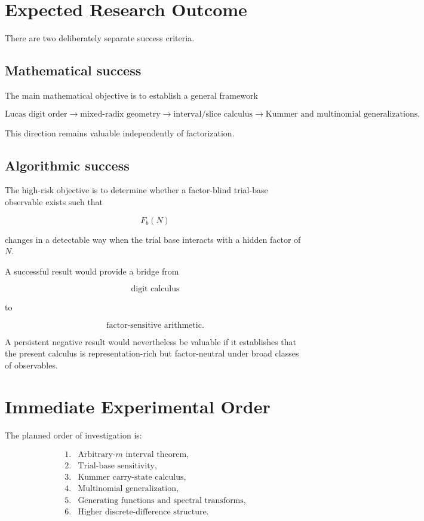 \documentclass[11pt]{article}
\begin{document}
\section{Expected Research Outcome}

There are two deliberately separate success criteria.

\subsection*{Mathematical success}

The main mathematical objective is to establish a general framework

$$
\boxed{
\text{Lucas digit order}
\longrightarrow
\text{mixed-radix geometry}
\longrightarrow
\text{interval/slice calculus}
\longrightarrow
\text{Kummer and multinomial generalizations}.
}
$$

This direction remains valuable independently of factorization.

\subsection*{Algorithmic success}

The high-risk objective is to determine whether a factor-blind trial-base observable exists such that

$$
F_b(N)
$$

changes in a detectable way when the trial base interacts with a hidden factor of $N$.

A successful result would provide a bridge from

$$
\text{digit calculus}
$$

to

$$
\text{factor-sensitive arithmetic}.
$$

A persistent negative result would nevertheless be valuable if it establishes that the present calculus is representation-rich but factor-neutral under broad classes of observables.

\section{Immediate Experimental Order}

The planned order of investigation is:

$$
\boxed{
\begin{array}{cl}
1. & \text{Arbitrary-$m$ interval theorem},\\[2mm]
2. & \text{Trial-base sensitivity},\\[2mm]
3. & \text{Kummer carry-state calculus},\\[2mm]
4. & \text{Multinomial generalization},\\[2mm]
5. & \text{Generating functions and spectral transforms},\\[2mm]
6. & \text{Higher discrete-difference structure}.
\end{array}
}
$$
\end{document}

